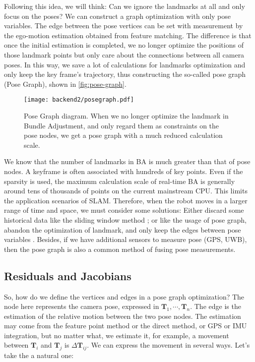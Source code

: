 Following this idea, we will think: Can we ignore the landmarks at all and only focus on the poses? We can construct a graph optimization with only pose variables. The edge between the pose vertices can be set with measurement by the ego-motion estimation obtained from feature matching. The difference is that once the initial estimation is completed, we no longer optimize the positions of those landmark points but only care about the connections between all camera poses. In this way, we save a lot of calculations for landmarks optimization and only keep the key frame's trajectory, thus constructing the so-called pose graph (Pose Graph), shown in \autoref{fig:pose-graph}.

\begin{figure}[!ht]
	\centering
	\texttt{[image: backend2/posegraph.pdf]}
	\caption{Pose Graph diagram. When we no longer optimize the landmark in Bundle Adjustment, and only regard them as constraints on the pose nodes, we get a pose graph with a much reduced calculation scale.}
	\label{fig:pose-graph}
\end{figure}

We know that the number of landmarks in BA is much greater than that of pose nodes. A keyframe is often associated with hundreds of key points. Even if the sparsity is used, the maximum calculation scale of real-time BA is generally around tens of thousands of points on the current mainstream CPU. This limits the application scenarios of SLAM. Therefore, when the robot moves in a larger range of time and space, we must consider some solutions: Either discard some historical data like the sliding window method {\cite{Strasdat2011}}; or like the usage of pose graph, abandon the optimization of landmark, and only keep the edges between pose variables {\cite{Dubbelman2015, Lee2014, Latif2013}}. Besides, if we have additional sensors to measure pose (GPS, UWB), then the pose graph is also a common method of fusing pose measurements.

\subsection{Residuals and Jacobians}
So, how do we define the vertices and edges in a pose graph optimization? The node here represents the camera pose, expressed in $\bm{T}_1, \cdots, \bm{T}_n$. The edge is the estimation of the relative motion between the two pose nodes. The estimation may come from the feature point method or the direct method, or GPS or IMU integration, but no matter what, we estimate it, for example, a movement between $\bm{T}_i$ and $\bm{T}_j$ is $\Delta \bm{T}_{ij}$. We can express the movement in several ways. Let's take the a natural one:

